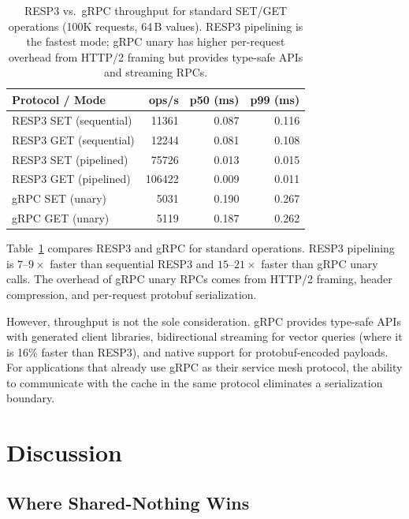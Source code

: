 \documentclass[conference]{IEEEtran}
\begin{document}
\begin{table}[t]
\centering
\caption{RESP3 vs.\ gRPC throughput for standard SET/GET operations
(100K requests, 64\,B values). RESP3 pipelining is the fastest mode;
gRPC unary has higher per-request overhead from HTTP/2 framing but
provides type-safe APIs and streaming RPCs.}
\label{tab:grpc}
\small
\begin{tabular}{@{}lrrr@{}}
\toprule
\textbf{Protocol / Mode} & \textbf{ops/s} & \textbf{p50 (ms)} & \textbf{p99 (ms)} \\
\midrule
RESP3 SET (sequential)  & \num{11361}  & 0.087 & 0.116 \\
RESP3 GET (sequential)  & \num{12244}  & 0.081 & 0.108 \\
RESP3 SET (pipelined)   & \num{75726}  & 0.013 & 0.015 \\
RESP3 GET (pipelined)   & \num{106422} & 0.009 & 0.011 \\
gRPC SET (unary)        & \num{5031}   & 0.190 & 0.267 \\
gRPC GET (unary)        & \num{5119}   & 0.187 & 0.262 \\
\bottomrule
\end{tabular}
\end{table}

Table~\ref{tab:grpc} compares RESP3 and gRPC for standard
operations. RESP3 pipelining is $7$--$9\times$ faster than sequential
RESP3 and $15$--$21\times$ faster than gRPC unary calls. The overhead
of gRPC unary RPCs comes from HTTP/2 framing, header compression,
and per-request protobuf serialization.

However, throughput is not the sole consideration. gRPC provides
type-safe APIs with generated client libraries, bidirectional
streaming for vector queries (where it is 16\% faster than RESP3),
and native support for protobuf-encoded payloads. For applications
that already use gRPC as their service mesh protocol, the ability
to communicate with the cache in the same protocol eliminates a
serialization boundary.


\section{Discussion}
\label{sec:discussion}

\subsection{Where Shared-Nothing Wins}
\end{document}
